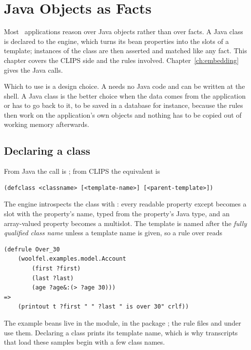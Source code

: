 \chapter{Java Objects as Facts}
\label{ch:java-objects}

Most \Morendo\ applications reason over Java objects rather than over
 facts. A Java class is declared to the engine, which
turns its bean properties into the slots of a template; instances of the
class are then asserted and matched like any fact. This chapter covers the
CLIPS side and the rules involved. Chapter~\ref{ch:embedding} gives the
Java calls.

Which to use is a design choice. A  needs no Java code
and can be written at the shell. A Java class is the better choice when
the data comes from the application or has to go back to it, to be saved
in a database for instance, because the rules then work on the
application's own objects and nothing has to be copied out of working
memory afterwards.

\section{Declaring a class}

From Java the call is ; from CLIPS
the equivalent is

\begin{lstlisting}
(defclass <classname> [<template-name>] [<parent-template>])
\end{lstlisting}

The engine introspects the class with : every
readable property except  becomes a slot with the property's
name, typed from the property's Java type, and an array-valued property
becomes a multislot. The template is named after the \emph{fully
qualified class name} unless a template name is given, so a rule over
 reads

\begin{lstlisting}
(defrule Over_30
    (woolfel.examples.model.Account
        (first ?first)
        (last ?last)
        (age ?age&:(> ?age 30)))
=>
    (printout t ?first " " ?last " is over 30" crlf))
\end{lstlisting}

The example beans live in the  module, in the package
; the rule files  and
 under  use them. Declaring a class prints its
template name, which is why transcripts that load these samples begin
with a few class names.

